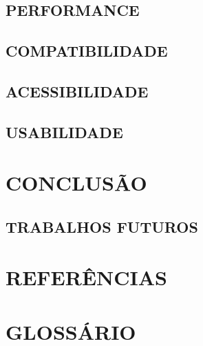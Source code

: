 \documentclass[12pt,a4paper]{article}
\begin{document}
		\lipsum[1]

		\subsection{PERFORMANCE}

			\lipsum[1]

		\subsection{COMPATIBILIDADE}

			\lipsum[1]

		\subsection{ACESSIBILIDADE}

			\lipsum[1]

		\subsection{USABILIDADE}

			\lipsum[1]


	\section{CONCLUSÃO}

	\lipsum[1]

		\subsection{TRABALHOS FUTUROS}

			\lipsum[1]

	\newpage


	\section*{REFERÊNCIAS}

	\printbibliography[heading=none]

	\newpage

	\section*{GLOSSÁRIO}
\end{document}
